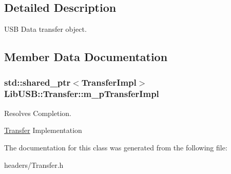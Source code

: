\subsection{Detailed Description}
U\-S\-B Data transfer object. 

\subsection{Member Data Documentation}
\hypertarget{class_lib_u_s_b_1_1_transfer_a09688b01c634cfdb522fb0c229da7308}{
\subsubsection[{m\-\_\-p\-Transfer\-Impl}]{\setlength{\rightskip}{0pt plus 5cm}std\-::shared\-\_\-ptr$<$Transfer\-Impl$>$ Lib\-U\-S\-B\-::\-Transfer\-::m\-\_\-p\-Transfer\-Impl\hspace{0.3cm}{\ttfamily [protected]}}}\label{class_lib_u_s_b_1_1_transfer_a09688b01c634cfdb522fb0c229da7308}


Resolves Completion. 

\hyperlink{class_lib_u_s_b_1_1_transfer}{Transfer} Implementation 

The documentation for this class was generated from the following file\-:\begin{DoxyCompactItemize}
\item 
headers/Transfer.\-h\end{DoxyCompactItemize}
